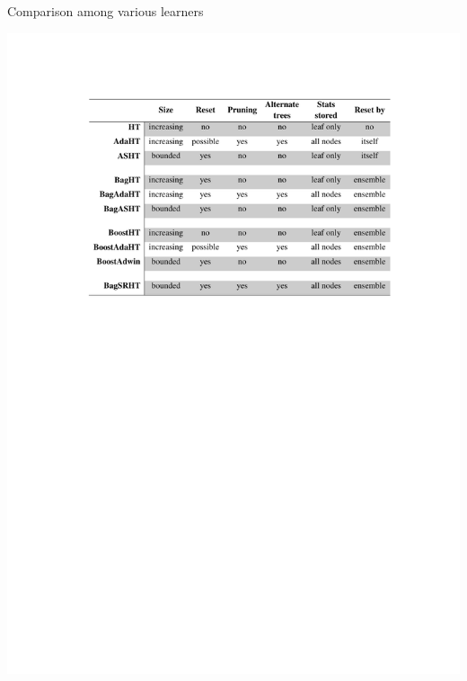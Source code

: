 \begin{table}[htbp]
    \caption{Comparison among various learners}
    \label{tab:treecomp}
    \vspace{-5mm}
    \begin{center}
    \includegraphics{figs/treescomp.pdf}
    \end{center}
\end{table}

